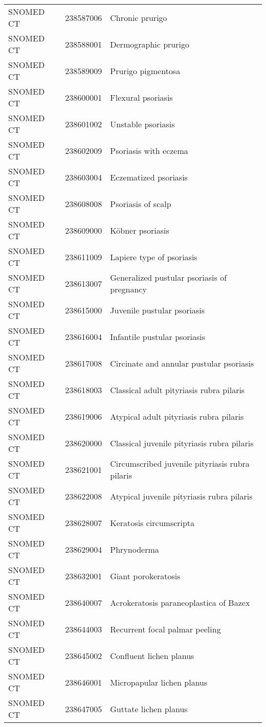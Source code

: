 \begin{longtable}{p{}p{}p{}}
  SNOMED CT & 238587006 & Chronic prurigo \\ 
  SNOMED CT & 238588001 & Dermographic prurigo \\ 
  SNOMED CT & 238589009 & Prurigo pigmentosa \\ 
  SNOMED CT & 238600001 & Flexural psoriasis \\ 
  SNOMED CT & 238601002 & Unstable psoriasis \\ 
  SNOMED CT & 238602009 & Psoriasis with eczema \\ 
  SNOMED CT & 238603004 & Eczematized psoriasis \\ 
  SNOMED CT & 238608008 & Psoriasis of scalp \\ 
  SNOMED CT & 238609000 & Köbner psoriasis \\ 
  SNOMED CT & 238611009 & Lapiere type of psoriasis \\ 
  SNOMED CT & 238613007 & Generalized pustular psoriasis of pregnancy \\ 
  SNOMED CT & 238615000 & Juvenile pustular psoriasis \\ 
  SNOMED CT & 238616004 & Infantile pustular psoriasis \\ 
  SNOMED CT & 238617008 & Circinate and annular pustular psoriasis \\ 
  SNOMED CT & 238618003 & Classical adult pityriasis rubra pilaris \\ 
  SNOMED CT & 238619006 & Atypical adult pityriasis rubra pilaris \\ 
  SNOMED CT & 238620000 & Classical juvenile pityriasis rubra pilaris \\ 
  SNOMED CT & 238621001 & Circumscribed juvenile pityriasis rubra pilaris \\ 
  SNOMED CT & 238622008 & Atypical juvenile pityriasis rubra pilaris \\ 
  SNOMED CT & 238628007 & Keratosis circumscripta \\ 
  SNOMED CT & 238629004 & Phrynoderma \\ 
  SNOMED CT & 238632001 & Giant porokeratosis \\ 
  SNOMED CT & 238640007 & Acrokeratosis paraneoplastica of Bazex \\ 
  SNOMED CT & 238644003 & Recurrent focal palmar peeling \\ 
  SNOMED CT & 238645002 & Confluent lichen planus \\ 
  SNOMED CT & 238646001 & Micropapular lichen planus \\ 
  SNOMED CT & 238647005 & Guttate lichen planus \\ 

\end{longtable}
